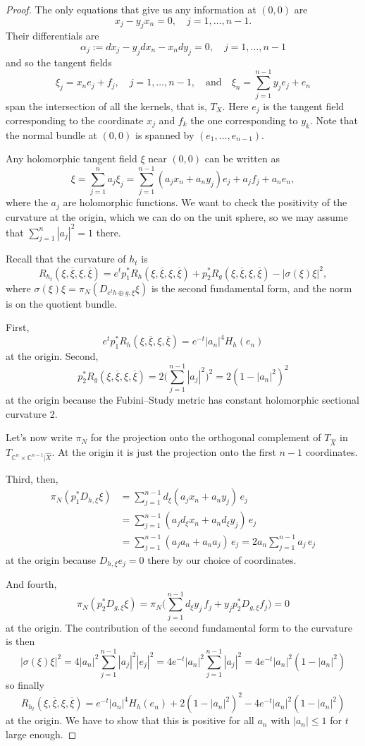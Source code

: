 \documentclass[10pt,a4paper]{amsart}
\newcommand{\kk}[1]{\mathbb{#1}}
\def\qandq{\quad\text{and}\quad}
\def\ov#1{\overline{#1}}
\def\hsc{holomorphic sectional curvature}
\def\bl#1{\widehat{#1}}
\def\blX{\bl{X}}
\begin{document}
\begin{proof}
The only equations that give us any information at $(0,0)$ are
$$
x_j - y_j x_n = 0, \quad j = 1, \ldots, n-1.
$$
Their differentials are
$$
\alpha_j := dx_j - y_j dx_n - x_n dy_j = 0, \quad j=1,\ldots,n-1
$$
and so the tangent fields
$$
\xi_j = x_n e_j + f_j,
\quad j=1,\ldots,n-1,
\qandq
\xi_n = \sum_{j=1}^{n-1} y_j e_j + e_n
$$
span the intersection of all the kernels, that is, $T_X$.
Here $e_j$ is the tangent field corresponding to the coordinate $x_j$
and $f_k$ the one corresponding to $y_k$.
Note that the normal bundle at $(0,0)$ is spanned by $(e_1, \ldots, e_{n-1})$.

Any holomorphic tangent field $\xi$ near $(0,0)$ can be written as
$$
\xi = \sum_{j=1}^n a_j \xi_j
= \sum_{j=1}^{n-1} (a_j x_n + a_n y_j) e_j + a_j f_j
+ a_n e_n,
$$
where the $a_j$ are holomorphic functions.
We want to check the positivity of the curvature at the origin, which we can do
on the unit sphere, so we may assume that $\sum_{j=1}^n |a_j|^2 = 1$ there.

Recall that the curvature of $h_t$ is
$$
R_{h_t}(\xi, \ov\xi, \xi, \ov\xi)
= e^t p_1^* R_h(\xi, \ov\xi, \xi, \ov\xi)
+ p_2^* R_g(\xi, \ov\xi, \xi, \ov\xi)
- |\sigma(\xi)\xi|^2,
$$
where $\sigma(\xi)\xi = \pi_N(D_{e^th \oplus g,\xi} \xi)$ is the second
fundamental form, and the norm is on the quotient bundle.

First,
$$
e^t p_1^*R_h(\xi, \ov\xi, \xi, \ov\xi)
= e^{-t} |a_n|^4 H_h(e_n)
$$
at the origin. Second,
$$
p_2^*R_g(\xi, \ov\xi, \xi, \ov\xi)
= 2 \biggl(\sum_{j=1}^{n-1} |a_j|^2\biggr)^2
= 2(1 - |a_n|^2)^2
$$
at the origin
because the Fubini--Study metric has constant \hsc{} 2.

Let's now write $\pi_N$ for the projection onto the orthogonal complement of
$T_{\blX}$ in $T_{\kk C^n \times \kk C^{n-1}|\blX}$.
At the origin it is just the projection onto the first $n-1$ coordinates.

Third, then,
\begin{align*}
\pi_N(p_1^*D_{h,\xi} \xi)
&= \sum_{j=1}^{n-1} d_{\xi}(a_j x_n + a_n y_j) \, e_j
\\
&= \sum_{j=1}^{n-1} (a_j d_{\xi}x_n + a_n d_{\xi} y_j) \, e_j
\\
&= \sum_{j=1}^{n-1} (a_j a_n + a_n a_j ) \, e_j
= 2 a_n \sum_{j=1}^{n-1} a_j \, e_j
\end{align*}
at the origin
because $D_{h,\xi} e_j = 0$ there by our choice of coordinates.

And fourth,
$$
\pi_N(p_2^*D_{g,\xi} \xi)
= \pi_N \biggl( \sum_{j=1}^{n-1} d_\xi y_j \, f_j + y_j p_2^*D_{g,\xi} f_j \biggr) = 0
$$
at the origin.
The contribution of the second fundamental form to the curvature is then
$$
|\sigma(\xi)\xi|^2
= 4 |a_n|^2 \sum_{j=1}^{n-1} |a_j|^2 |e_j|^2
= 4 e^{-t} |a_n|^2 \sum_{j=1}^{n-1} |a_j|^2
= 4 e^{-t} |a_n|^2(1 - |a_n|^2)
$$
so finally
$$
R_{h_t}(\xi, \ov\xi, \xi, \ov\xi)
= e^{-t} |a_n|^4 H_h(e_n)
+ 2(1 - |a_n|^2)^2
- 4 e^{-t} |a_n|^2(1 - |a_n|^2)
$$
at the origin.
We have to show that this is positive for all $a_n$ with $|a_n| \leq 1$ for $t$
large enough.


\end{proof}
\end{document}
